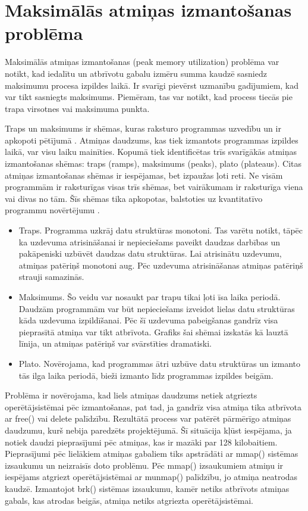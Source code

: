 \section{Maksimālās atmiņas izmantošanas problēma}
 \label{sec:peak_mem}
 Maksimālās atmiņas izmantošanas (peak memory utilization) problēma var notikt, kad iedalītu un atbrīvotu gabalu izmēru summa kaudzē sasniedz maksimumu procesa izpildes laikā.
Ir svarīgi pievērst uzmanību gadījumiem, kad var tikt sasniegts maksimums.
Piemēram, tas var notikt, kad process tiecās pie trapa virsotnes vai maksimuma punkta.

Traps un maksimums ir shēmas, kuras raksturo programmas uzvedību un ir apkopoti pētījumā \cite{PWMS}. Atmiņas daudzums, kas tiek izmantots programmas izpildes laikā, var visu laiku mainīties.
Kopumā tiek identificētas trīs svarīgākās atmiņas izmantošanas shēmas: traps (ramps),  maksimums (peaks),  plato (plateaus).
Citas atmiņas izmantošanas shēmas ir iespējamas, bet izpaužas ļoti reti.
Ne visām programmām ir raksturīgas visas trīs shēmas, bet vairākumam ir raksturīga viena vai divas no tām.
Šīs shēmas tika apkopotas, balstoties uz kvantitatīvo programmu novērtējumu \cite{PWMS}. 
\begin{itemize}
\item Traps. Programma uzkrāj datu struktūras monotoni. 
Tas varētu notikt, tāpēc ka uzdevuma atrisināšanai ir nepieciešams paveikt daudzas darbības un pakāpeniski uzbūvēt daudzas  datu struktūras. 
Lai atrisinātu uzdevumu, atmiņas patēriņš monotoni aug. Pēc uzdevuma atrisināšanas atmiņas patēriņš strauji samazinās.
\item Maksimums. Šo veidu var nosaukt par trapu tikai ļoti īsa laika periodā.
Daudzām programmām var būt nepieciešams izveidot lielas datu struktūras kāda uzdevuma izpildīšanai.
Pēc šī uzdevuma pabeigšanas gandrīz visa pieprasītā atmiņa var tikt atbrīvota.
Grafiks šai shēmai izskatās kā lauztā līnija, un atmiņas patēriņš var svārstīties dramatiski.
\item Plato. Novērojama, kad programmas ātri uzbūve datu struktūras un izmanto tās ilga laika periodā, bieži izmanto līdz programmas izpildes beigām.
\end{itemize}


Problēma ir novērojama, kad liels atmiņas daudzums netiek atgriezts operētājsistēmai pēc izmantošanas, pat tad, ja gandrīz visa atmiņa tika atbrīvota ar free() vai delete palīdzību.
Rezultātā process var patērēt pārmērīgo atmiņas daudzumu, kurš nebija paredzēts projektējumā.
Šī situācija kļūst iespējama, ja notiek daudzi pieprasījumi pēc atmiņas, kas ir mazāki par 128 kilobaitiem.
Pieprasījumi pēc lielākiem atmiņas gabaliem tiks apstrādāti ar mmap() sistēmas izsaukumu un neizraisīs doto problēmu.
Pēc mmap() izsaukumiem atmiņu ir iespējams atgriezt operētājsistēmai ar munmap() palīdzību, jo atmiņa neatrodas kaudzē. 
Izmantojot brk() sistēmas izsaukumu, kamēr netiks atbrīvots atmiņas gabals, kas atrodas beigās, atmiņa netiks atgriezta operētājsistēmai.

